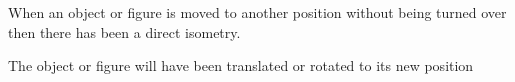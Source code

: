 When an object or figure  is moved to another position 
without being turned over then there has been a direct isometry. 
\par
The object or figure will have been translated or rotated to its 
new position